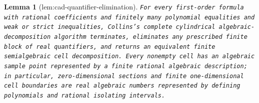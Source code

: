 \documentclass{article}
\newtheorem{lemma}{Lemma}
\begin{document}
\begin{lemma}[lem:cad-quantifier-elimination]\label{lem:cad-quantifier-elimination}
\texttt{For every first-\allowbreak{}order formula with rational coefficients and finitely many polynomial equalities and weak or strict inequalities,\allowbreak{} Collins's complete cylindrical algebraic-\allowbreak{}decomposition algorithm terminates,\allowbreak{} eliminates any prescribed finite block of real quantifiers,\allowbreak{} and returns an equivalent finite semialgebraic cell decomposition.  Every nonempty cell has an algebraic sample point represented by a finite rational algebraic description;\allowbreak{} in particular,\allowbreak{} zero-\allowbreak{}dimensional sections and finite one-\allowbreak{}dimensional cell boundaries are real algebraic numbers represented by defining polynomials and rational isolating intervals.}
\end{lemma}
\end{document}
